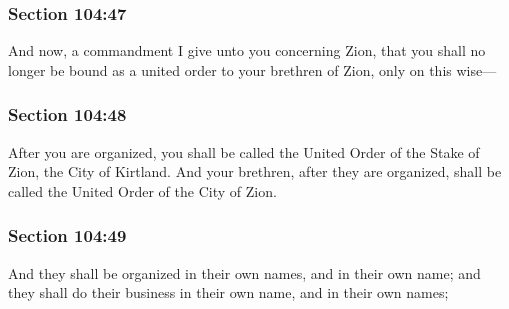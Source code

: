 	\subsubsection{Section 104:47} %
		\label{DC104-47}

		And now, a commandment I give unto you concerning Zion, that you shall no longer be bound as a united order to your brethren of Zion, only on this wise---


	\subsubsection{Section 104:48} %
		\label{DC104-48}

		After you are organized, you shall be called the United Order of the Stake of Zion, the City of Kirtland.  And your brethren, after they are organized, shall be called the United Order of the City of Zion.


	\subsubsection{Section 104:49} %
		\label{DC104-49}

		And they shall be organized in their own names, and in their own name; and they shall do their business in their own name, and in their own names;


